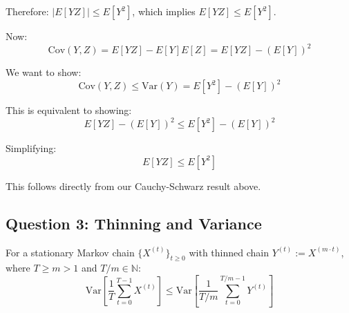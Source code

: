 Therefore: $|E[YZ]| \leq E[Y^2]$, which implies $E[YZ] \leq E[Y^2]$.

Now:
\[
\text{Cov}(Y,Z) = E[YZ] - E[Y]E[Z] = E[YZ] - (E[Y])^2
\]

We want to show:
\[
\text{Cov}(Y,Z) \leq \text{Var}(Y) = E[Y^2] - (E[Y])^2
\]

This is equivalent to showing:
\[
E[YZ] - (E[Y])^2 \leq E[Y^2] - (E[Y])^2
\]

Simplifying:
\[
E[YZ] \leq E[Y^2]
\]

This follows directly from our Cauchy-Schwarz result above. 


\subsection*{Question 3: Thinning and Variance}





\begin{theorem}
For a stationary Markov chain $\{X^{(t)}\}_{t \geq 0}$ with thinned chain $Y^{(t)} := X^{(m \cdot t)}$, where $T \geq m > 1$ and $T/m \in \mathbb{N}$:
\[
\text{Var}\left[\frac{1}{T}\sum_{t=0}^{T-1} X^{(t)}\right] \leq \text{Var}\left[\frac{1}{T/m}\sum_{t=0}^{T/m-1} Y^{(t)}\right]
\]
\end{theorem}


